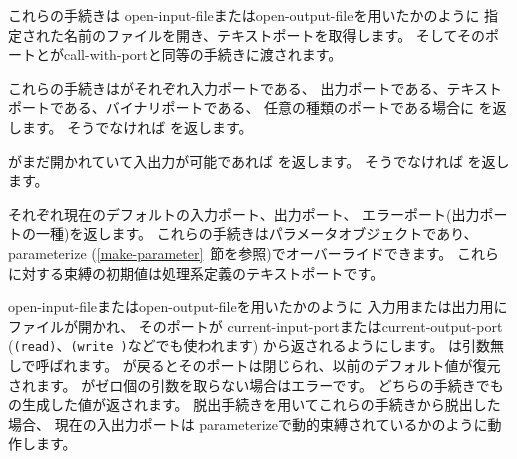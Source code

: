\begin{entry}{%
}

これらの手続きは
{\cf open-input-file}または{\cf open-\+output-\+file}を用いたかのように
指定された名前のファイルを開き、テキストポートを取得します。
そしてそのポートとが{\cf call-\+with-\+port}と同等の手続きに渡されます。
\end{entry}

\begin{entry}{%
}

これらの手続きはがそれぞれ入力ポートである、
出力ポートである、テキストポートである、バイナリポートである、
任意の種類のポートである場合に \schtrue{}を返します。
そうでなければ \schfalse{}を返します。

\end{entry}


\begin{entry}{%
}

がまだ開かれていて入出力が可能であれば %
\schtrue{}を返します。 そうでなければ \schfalse{}を返します。


\end{entry}


\begin{entry}{%
}

それぞれ現在のデフォルトの入力ポート、出力ポート、
エラーポート(出力ポートの一種)を返します。
これらの手続きはパラメータオブジェクトであり、
{\cf parameterize} (\ref{make-parameter}~節を参照)でオーバーライドできます。
これらに対する束縛の初期値は処理系定義のテキストポートです。

\end{entry}


\begin{entry}{%
}

{\cf open-input-file}または{\cf open-output-file}を用いたかのように
入力用または出力用にファイルが開かれ、
そのポートが
{\cf current-input-port}または{\cf current-output-port}
({\tt (read)}、{\tt (write )}などでも使われます)
から返されるようにします。
は引数無しで呼ばれます。
が戻るとそのポートは閉じられ、以前のデフォルト値が復元されます。
がゼロ個の引数を取らない場合はエラーです。
どちらの手続きでもの生成した値が返されます。
脱出手続きを用いてこれらの手続きから脱出した場合、
現在の入出力ポートは
{\cf parameterize}で動的束縛されているかのように動作します。


\end{entry}



